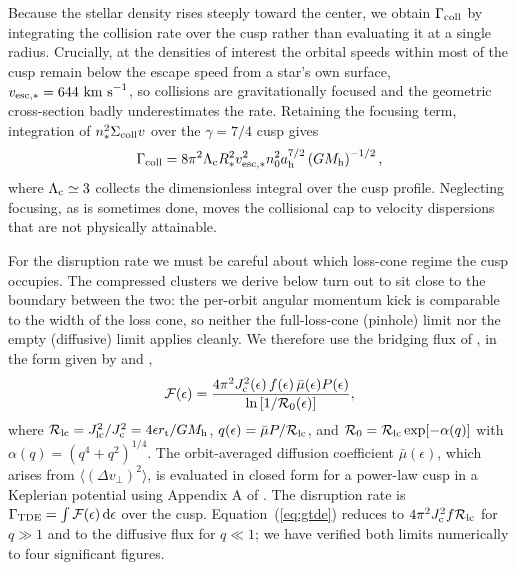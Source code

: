 \documentclass[preprint2]{aastex}
\begin{document}
Because the stellar density rises steeply toward the center, we obtain $\Gamma_{\rm coll}$ by integrating the collision rate over the cusp rather than evaluating it at a single radius. Crucially, at the densities of interest the orbital speeds within most of the cusp remain below the escape speed from a star's own surface, $v_{\rm esc,\ast} = 644~{\rm km~s}^{-1}$, so collisions are gravitationally focused and the geometric cross-section badly underestimates the rate. Retaining the focusing term, integration of $n_{\ast}^{2} \Sigma_{\rm coll} v$ over the $\gamma = 7/4$ cusp gives
\begin{equation}
\Gamma_{\rm coll} = 8 \pi^{2} \Lambda_{\rm c} R_{\ast}^{2} v_{\rm esc,\ast}^{2} n_{0}^{2} a_{\rm h}^{7/2} \left(G M_{\rm h}\right)^{-1/2},\label{eq:gcoll}
\end{equation}
where $\Lambda_{\rm c} \simeq 3$ collects the dimensionless integral over the cusp profile. Neglecting focusing, as is sometimes done, moves the collisional cap to velocity dispersions that are not physically attainable.

For the disruption rate we must be careful about which loss-cone regime the cusp occupies. The compressed clusters we derive below turn out to sit close to the boundary between the two: the per-orbit angular momentum kick is comparable to the width of the loss cone, so neither the full-loss-cone (pinhole) limit nor the empty (diffusive) limit applies cleanly. We therefore use the bridging flux of \citet{Cohn:1978a}, in the form given by \citet{Merritt:2013a} and \citet{Vasiliev:2013a},
\begin{equation}
{\cal F}(\epsilon) = \frac{4 \pi^{2} J_{\rm c}^{2}(\epsilon)\, f(\epsilon)\, \bar{\mu}(\epsilon) P(\epsilon)}{\ln\left[1/{\cal R}_{0}(\epsilon)\right]},
\label{eq:gtde}
\end{equation}
where ${\cal R}_{\rm lc} = J_{\rm lc}^{2}/J_{\rm c}^{2} = 4\epsilon r_{\rm t}/GM_{\rm h}$, $q(\epsilon) = \bar{\mu}P/{\cal R}_{\rm lc}$, and ${\cal R}_{0} = {\cal R}_{\rm lc}\exp[-\alpha(q)]$ with $\alpha(q) = (q^{4}+q^{2})^{1/4}$. The orbit-averaged diffusion coefficient $\bar{\mu}(\epsilon)$, which arises from $\langle(\Delta v_{\perp})^{2}\rangle$, is evaluated in closed form for a power-law cusp in a Keplerian potential using Appendix A of \citet{Stone:2016a}. The disruption rate is $\Gamma_{\rm TDE} = \int {\cal F}(\epsilon)\,{\rm d}\epsilon$ over the cusp. Equation~(\ref{eq:gtde}) reduces to $4\pi^{2}J_{\rm c}^{2}f{\cal R}_{\rm lc}$ for $q \gg 1$ and to the diffusive flux for $q \ll 1$; we have verified both limits numerically to four significant figures.
\end{document}
